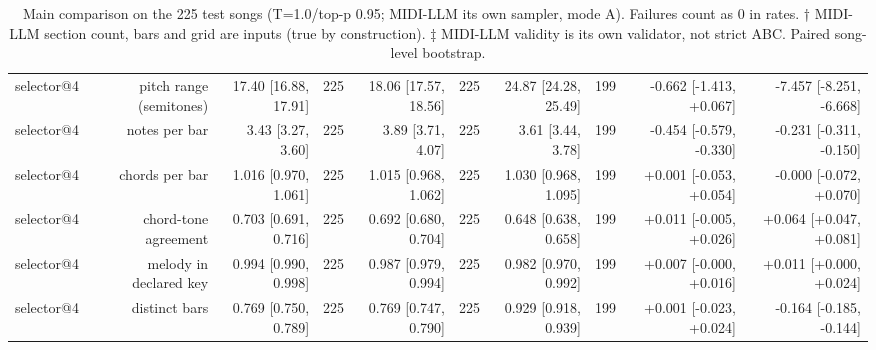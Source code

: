 \begin{table}[t]
\begin{tabular}{lrrrrrrrrr}
selector@4 & pitch range (semitones) & 17.40 [16.88, 17.91] & 225 & 18.06 [17.57, 18.56] & 225 & 24.87 [24.28, 25.49] & 199 & -0.662 [-1.413, +0.067] & -7.457 [-8.251, -6.668] \\
selector@4 & notes per bar & 3.43 [3.27, 3.60] & 225 & 3.89 [3.71, 4.07] & 225 & 3.61 [3.44, 3.78] & 199 & -0.454 [-0.579, -0.330] & -0.231 [-0.311, -0.150] \\
selector@4 & chords per bar & 1.016 [0.970, 1.061] & 225 & 1.015 [0.968, 1.062] & 225 & 1.030 [0.968, 1.095] & 199 & +0.001 [-0.053, +0.054] & -0.000 [-0.072, +0.070] \\
selector@4 & chord-tone agreement & 0.703 [0.691, 0.716] & 225 & 0.692 [0.680, 0.704] & 225 & 0.648 [0.638, 0.658] & 199 & +0.011 [-0.005, +0.026] & +0.064 [+0.047, +0.081] \\
selector@4 & melody in declared key & 0.994 [0.990, 0.998] & 225 & 0.987 [0.979, 0.994] & 225 & 0.982 [0.970, 0.992] & 199 & +0.007 [-0.000, +0.016] & +0.011 [+0.000, +0.024] \\
selector@4 & distinct bars & 0.769 [0.750, 0.789] & 225 & 0.769 [0.747, 0.790] & 225 & 0.929 [0.918, 0.939] & 199 & +0.001 [-0.023, +0.024] & -0.164 [-0.185, -0.144] \\
\bottomrule
\end{tabular}
\caption{Main comparison on the 225 test songs (T=1.0/top-p 0.95; MIDI-LLM its own sampler, mode A). Failures count as 0 in rates. † MIDI-LLM section count, bars and grid are inputs (true by construction). ‡ MIDI-LLM validity is its own validator, not strict ABC. Paired song-level bootstrap.}
\label{tab:model_comparison}
\end{table}
